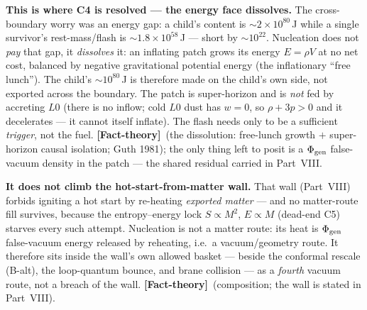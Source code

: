 \documentclass[11pt]{article}
\newcommand{\factth}{\textcolor{green!40!black}{\textbf{[Fact-theory]}}}
\begin{document}
\medskip\noindent\textbf{This is where C4 is resolved --- the energy face dissolves.} The cross-boundary worry was an energy gap: a child's content is $\sim\!2\times10^{80}$\,J while a single survivor's rest-mass/flash is $\sim\!1.8\times10^{58}$\,J --- short by $\sim\!10^{22}$. Nucleation does not \emph{pay} that gap, it \emph{dissolves} it: an inflating patch grows its energy $E=\rho V$ at no net cost, balanced by negative gravitational potential energy (the inflationary ``free lunch''). The child's $\sim\!10^{80}$\,J is therefore made on the child's own side, not exported across the boundary. The patch is super-horizon and is \emph{not} fed by accreting $L0$ (there is no inflow; cold $L0$ dust has $w=0$, so $\rho+3p>0$ and it decelerates --- it cannot itself inflate). The flash needs only to be a sufficient \emph{trigger}, not the fuel. \factth\ (the dissolution: free-lunch growth $+$ super-horizon causal isolation; Guth 1981); the only thing left to posit is a $\Phi_{\rm gen}$ false-vacuum density in the patch --- the shared residual carried in Part~VIII.

\medskip\noindent\textbf{It does not climb the hot-start-from-matter wall.} That wall (Part~VIII) forbids igniting a hot start by re-heating \emph{exported matter} --- and no matter-route fill survives, because the entropy--energy lock $S\propto M^2$, $E\propto M$ (dead-end C5) starves every such attempt. Nucleation is not a matter route: its heat is $\Phi_{\rm gen}$ false-vacuum energy released by reheating, i.e.\ a vacuum/geometry route. It therefore sits inside the wall's own allowed basket --- beside the conformal rescale (B-alt), the loop-quantum bounce, and brane collision --- as a \emph{fourth} vacuum route, not a breach of the wall. \factth\ (composition; the wall is stated in Part~VIII).
\end{document}
